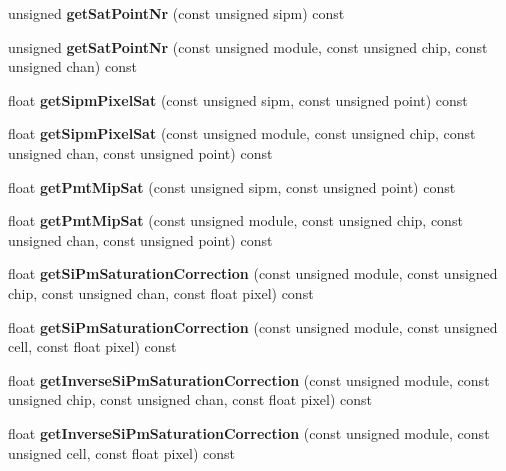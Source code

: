 \begin{DoxyCompactItemize}
\item 
unsigned {\bfseries getSatPointNr} (const unsigned sipm) const \label{classCALICE_1_1SiPmPropertiesProcessor_ad68505357900fde5b0581d213c2e0857}

\item 
unsigned {\bfseries getSatPointNr} (const unsigned module, const unsigned chip, const unsigned chan) const \label{classCALICE_1_1SiPmPropertiesProcessor_aa172924dd56f0c70743c851756e32d74}

\item 
float {\bfseries getSipmPixelSat} (const unsigned sipm, const unsigned point) const \label{classCALICE_1_1SiPmPropertiesProcessor_a1ecb6b6213167728a638f44e2bab3e30}

\item 
float {\bfseries getSipmPixelSat} (const unsigned module, const unsigned chip, const unsigned chan, const unsigned point) const \label{classCALICE_1_1SiPmPropertiesProcessor_a0dcb61b92932aa21ad7d7543fdb00bd8}

\item 
float {\bfseries getPmtMipSat} (const unsigned sipm, const unsigned point) const \label{classCALICE_1_1SiPmPropertiesProcessor_abb586ffb2881f2ff95cd2db60b724de7}

\item 
float {\bfseries getPmtMipSat} (const unsigned module, const unsigned chip, const unsigned chan, const unsigned point) const \label{classCALICE_1_1SiPmPropertiesProcessor_ae144f3314db5a24a359bd0e2f6823a37}

\item 
float {\bfseries getSiPmSaturationCorrection} (const unsigned module, const unsigned chip, const unsigned chan, const float pixel) const \label{classCALICE_1_1SiPmPropertiesProcessor_afd545661631706206e67218f3ef898eb}

\item 
float {\bfseries getSiPmSaturationCorrection} (const unsigned module, const unsigned cell, const float pixel) const \label{classCALICE_1_1SiPmPropertiesProcessor_a8358f97372e0e5d63d95393497420f7f}

\item 
float {\bfseries getInverseSiPmSaturationCorrection} (const unsigned module, const unsigned chip, const unsigned chan, const float pixel) const \label{classCALICE_1_1SiPmPropertiesProcessor_a13dd5628d87e88900168bd676c2426e9}

\item 
float {\bfseries getInverseSiPmSaturationCorrection} (const unsigned module, const unsigned cell, const float pixel) const \label{classCALICE_1_1SiPmPropertiesProcessor_a93644c4c6c78e16498362b7fdde0ddfa}


\end{DoxyCompactItemize}
